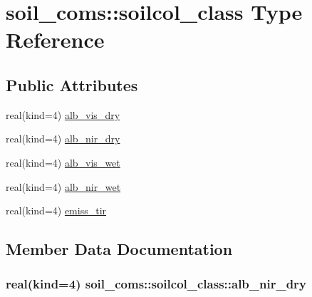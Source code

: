 \hypertarget{structsoil__coms_1_1soilcol__class}{}\section{soil\+\_\+coms\+:\+:soilcol\+\_\+class Type Reference}
\label{structsoil__coms_1_1soilcol__class}
\subsection*{Public Attributes}
\begin{DoxyCompactItemize}
\item 
real(kind=4) \hyperlink{structsoil__coms_1_1soilcol__class_a26fb51ecc2f4d51c9dcffaf003a91f2a}{alb\+\_\+vis\+\_\+dry}
\item 
real(kind=4) \hyperlink{structsoil__coms_1_1soilcol__class_a0199326ae49fca06646d39217cc389f8}{alb\+\_\+nir\+\_\+dry}
\item 
real(kind=4) \hyperlink{structsoil__coms_1_1soilcol__class_a38d9b036b4fca3d4b3c23d5a19a4e7df}{alb\+\_\+vis\+\_\+wet}
\item 
real(kind=4) \hyperlink{structsoil__coms_1_1soilcol__class_aafaed831a367d9dfa55f84402cbcc119}{alb\+\_\+nir\+\_\+wet}
\item 
real(kind=4) \hyperlink{structsoil__coms_1_1soilcol__class_a62a2febe4a46fb016a2ddaf87f24621f}{emiss\+\_\+tir}
\end{DoxyCompactItemize}


\subsection{Member Data Documentation}
\subsubsection[{\texorpdfstring{alb\+\_\+nir\+\_\+dry}{alb_nir_dry}}]{\setlength{\rightskip}{0pt plus 5cm}real(kind=4) soil\+\_\+coms\+::soilcol\+\_\+class\+::alb\+\_\+nir\+\_\+dry}\hypertarget{structsoil__coms_1_1soilcol__class_a0199326ae49fca06646d39217cc389f8}{}\label{structsoil__coms_1_1soilcol__class_a0199326ae49fca06646d39217cc389f8}
